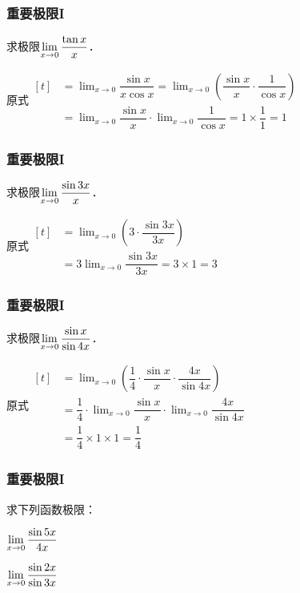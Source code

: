 \documentclass[14pt,notheorems,leqno,xcolor={rgb}]{beamer} %
\begin{document}
\begin{frame}
\frametitle{重要极限I}
\begin{example}
求极限$\lim\limits_{x\to0}\dfrac{\tan x}{x}$．
\end{example}
\pause
\begin{solution}
原式\noindent$\begin{aligned}[t]
&=\lim_{x\to0}\dfrac{\sin x}{x\cos x}=\lim_{x\to0}\left(\dfrac{\sin x}{x}\cdot\dfrac1{\cos x}\right)\\
&=\lim_{x\to0}\dfrac{\sin x}{x}\cdot\lim_{x\to0}\dfrac1{\cos x}=1\times\dfrac11=1
\end{aligned}$
\end{solution}
\end{frame}

\begin{frame}
\frametitle{重要极限I}
\begin{example}
求极限$\lim\limits_{x\to0}\dfrac{\sin 3x}{x}$．
\end{example}
\pause
\begin{solution}
原式\noindent$\begin{aligned}[t]
&=\lim_{x\to0}\left(3\cdot\dfrac{\sin 3x}{3x}\right)\\
&=3\lim_{x\to0}\dfrac{\sin 3x}{3x}=3\times1=3
\end{aligned}$
\end{solution}
\end{frame}

\begin{frame}
\frametitle{重要极限I}
\begin{example}
求极限$\lim\limits_{x\to0}\dfrac{\sin x}{\sin 4x}$．
\end{example}
\pause
\begin{solution}
原式\noindent$\begin{aligned}[t]
&=\lim_{x\to0}\left(\dfrac14\cdot\dfrac{\sin x}{x}\cdot\dfrac{4x}{\sin 4x}\right)\\
&=\dfrac14\cdot\lim_{x\to0}\dfrac{\sin x}{x}\cdot\lim_{x\to0}\dfrac{4x}{\sin 4x}\\
&=\dfrac14\times1\times1=\dfrac14
\end{aligned}$
\end{solution}
\end{frame}

\begin{oframe}
\frametitle{重要极限I}
\begin{exercise*}
求下列函数极限：
\begin{multicols}{2}
\begin{enumlite}
  \item $\lim\limits_{x\to0}\dfrac{\sin 5x}{4x}$
  \item $\lim\limits_{x\to0}\dfrac{\sin 2x}{\sin 3x}$
\end{enumlite}
\end{multicols}
\end{exercise*}
\end{oframe}
\end{document}
